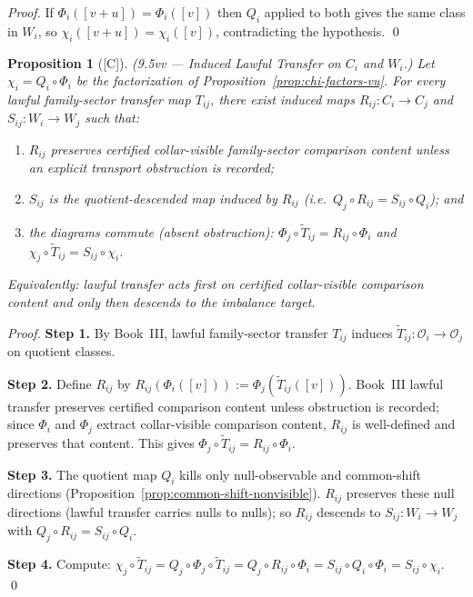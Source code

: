 \documentclass[12pt,oneside]{amsbook}
\theoremstyle{plain}
\newtheorem{proposition}[theorem]{Proposition}
\theoremstyle{definition}
\theoremstyle{remark}
\newcommand{\status}[1]{\textup{[#1]}}
\begin{document}
\begin{proof}
If $\Phi_i([v+u]) = \Phi_i([v])$ then $Q_i$ applied to both gives
the same class in $W_i$, so $\chi_i([v+u]) = \chi_i([v])$,
contradicting the hypothesis. \qed
\end{proof}

\begin{proposition}[\status{C}]\label{prop:induced-transfer-vv}
\textup{(9.5vv --- Induced Lawful Transfer on $C_i$ and $W_i$.)}
Let $\chi_i = Q_i \circ \Phi_i$ be the factorization of
Proposition~\ref{prop:chi-factors-vu}.  For every lawful
family-sector transfer map $T_{ij}$, there exist induced maps
$R_{ij} : C_i \to C_j$ and $S_{ij} : W_i \to W_j$ such that:
\begin{enumerate}[label=\textup{(\arabic*)}]
  \item $R_{ij}$ preserves certified collar-visible family-sector
    comparison content unless an explicit transport obstruction is
    recorded;
  \item $S_{ij}$ is the quotient-descended map induced by $R_{ij}$
    (i.e.\ $Q_j \circ R_{ij} = S_{ij} \circ Q_i$); and
  \item the diagrams commute (absent obstruction):
    $\Phi_j \circ \widetilde{T}_{ij} = R_{ij} \circ \Phi_i$
    and
    $\chi_j \circ \widetilde{T}_{ij} = S_{ij} \circ \chi_i$.
\end{enumerate}
Equivalently: lawful transfer acts first on certified collar-visible
comparison content and only then descends to the imbalance target.
\end{proposition}

\begin{proof}
\textbf{Step 1.}  By Book~III, lawful family-sector transfer $T_{ij}$
induces $\widetilde{T}_{ij} : \mathcal{O}_i \to \mathcal{O}_j$ on
quotient classes.

\textbf{Step 2.}  Define $R_{ij}$ by
$R_{ij}(\Phi_i([v])) := \Phi_j(\widetilde{T}_{ij}([v]))$.
Book~III lawful transfer preserves certified comparison content unless
obstruction is recorded; since $\Phi_i$ and $\Phi_j$ extract
collar-visible comparison content, $R_{ij}$ is well-defined and
preserves that content.  This gives
$\Phi_j \circ \widetilde{T}_{ij} = R_{ij} \circ \Phi_i$.

\textbf{Step 3.}  The quotient map $Q_i$ kills only null-observable and
common-shift directions
(Proposition~\ref{prop:common-shift-nonvisible}).  $R_{ij}$ preserves
these null directions (lawful transfer carries nulls to nulls); so
$R_{ij}$ descends to $S_{ij} : W_i \to W_j$ with
$Q_j \circ R_{ij} = S_{ij} \circ Q_i$.

\textbf{Step 4.}  Compute:
$\chi_j \circ \widetilde{T}_{ij}
= Q_j \circ \Phi_j \circ \widetilde{T}_{ij}
= Q_j \circ R_{ij} \circ \Phi_i
= S_{ij} \circ Q_i \circ \Phi_i
= S_{ij} \circ \chi_i$. \qed
\end{proof}
\end{document}
